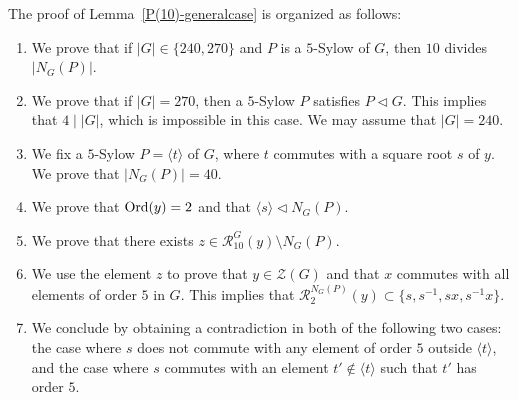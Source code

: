 \documentclass[12pt]{amsart}
\numberwithin{equation}{section}
\newcommand{\Ord}{{\rm Ord}}
\theoremstyle{definition}
\theoremstyle{remark}
\begin{document}
The proof of Lemma~\ref{P(10)-generalcase} is organized as follows: 
\begin{enumerate}
    \item We prove that if $|G|\in \{240,270\}$ and $P$ is a $5$-Sylow of $G$, then $10$ divides $|N_G(P)|$.
    \item We prove that if $|G|=270$, then a $5$-Sylow $P$ satisfies $P\lhd G$. This implies that $4 \mid |G|$, which is impossible in this case. We may assume that $|G|=240$.
    \item We fix a $5$-Sylow $P=\langle t\rangle$ of $G$, where $t$ commutes with a square root $s$ of $y$. We prove that $|N_G(P)|=40$.
    \item We prove that $\Ord(y)=2$ and that $\langle s\rangle \lhd N_G(P)$. 
    \item We prove that there exists $z\in \mathcal{R}_{10}^G(y)\setminus N_G(P)$.
    \item We use the element $z$ to prove that $y\in \mathcal{Z}(G)$ and that $x$ commutes with all elements of order $5$ in $G$. This implies that $\mathcal{R}_2^{N_G(P)}(y)\subset \{s,s^{-1}, sx, s^{-1}x\}$.
    \item We conclude by obtaining a contradiction in both of the following two cases: the case where $s$ does not commute with any element of order $5$ outside $\langle t\rangle$, and the case where $s$ commutes with an element $t'\notin \langle t\rangle$ such that $t'$ has order $5$. 
\end{enumerate}
\end{document}
